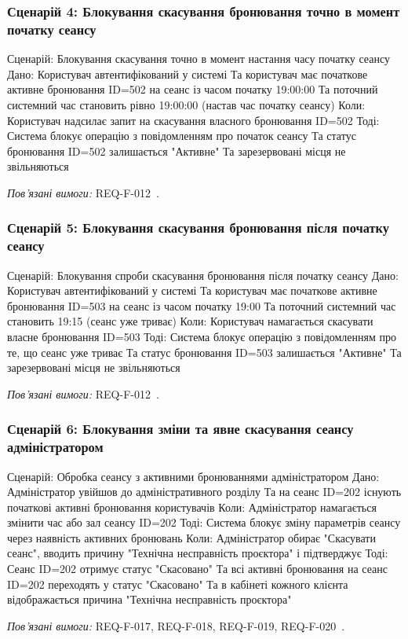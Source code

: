 \subsubsection{Сценарій 4: Блокування скасування бронювання точно в момент початку сеансу}\label{sec:bdd-sc4}
\begin{skedcode}
Сценарій: Блокування скасування точно в момент настання часу початку сеансу
  Дано: Користувач автентифікований у системі
    Та користувач має початкове активне бронювання ID=502 на сеанс із часом початку 19:00:00
    Та поточний системний час становить рівно 19:00:00 (настав час початку сеансу)
  Коли: Користувач надсилає запит на скасування власного бронювання ID=502
  Тоді: Система блокує операцію з повідомленням про початок сеансу
    Та статус бронювання ID=502 залишається "Активне"
    Та зарезервовані місця не звільняються
\end{skedcode}
\noindent\textit{Пов'язані вимоги:} REQ-F-012~.

\subsubsection{Сценарій 5: Блокування скасування бронювання після початку сеансу}\label{sec:bdd-sc5}
\begin{skedcode}
Сценарій: Блокування спроби скасування бронювання після початку сеансу
  Дано: Користувач автентифікований у системі
    Та користувач має початкове активне бронювання ID=503 на сеанс із часом початку 19:00
    Та поточний системний час становить 19:15 (сеанс уже триває)
  Коли: Користувач намагається скасувати власне бронювання ID=503
  Тоді: Система блокує операцію з повідомленням про те, що сеанс уже триває
    Та статус бронювання ID=503 залишається "Активне"
    Та зарезервовані місця не звільняються
\end{skedcode}
\noindent\textit{Пов'язані вимоги:} REQ-F-012~.

\subsubsection{Сценарій 6: Блокування зміни та явне скасування сеансу адміністратором}\label{sec:bdd-sc6}
\begin{skedcode}
Сценарій: Обробка сеансу з активними бронюваннями адміністратором
  Дано: Адміністратор увійшов до адміністративного розділу
    Та на сеанс ID=202 існують початкові активні бронювання користувачів
  Коли: Адміністратор намагається змінити час або зал сеансу ID=202
  Тоді: Система блокує зміну параметрів сеансу через наявність активних бронювань
  Коли: Адміністратор обирає "Скасувати сеанс", вводить причину "Технічна несправність проєктора" і підтверджує
  Тоді: Сеанс ID=202 отримує статус "Скасовано"
    Та всі активні бронювання на сеанс ID=202 переходять у статус "Скасовано"
    Та в кабінеті кожного клієнта відображається причина "Технічна несправність проєктора"
\end{skedcode}
\noindent\textit{Пов'язані вимоги:} REQ-F-017, REQ-F-018, REQ-F-019, REQ-F-020~.
